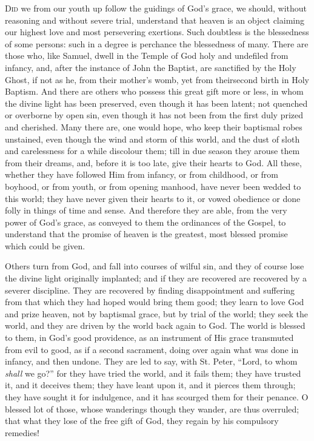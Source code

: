 D\textsc{id} we from our youth up follow the guidings of God's grace, we
should, without reasoning and without severe trial, understand that
heaven is an object claiming our highest love and most persevering
exertions. Such doubtless is the blessedness of some persons: such in
a degree is perchance the blessedness of many. There are those who,
like Samuel, dwell in the Temple of God holy and undefiled from
infancy, and, after the instance of John the Baptist, are sanctified
by the Holy Ghost, if not as he, from their mother's womb, yet from
their\emph{}second birth in Holy Baptism. And there are others who
possess this great gift more or less, in whom the divine light has
been preserved, even though it has been latent; not quenched or
overborne by open sin, even though it has not been from the first duly
prized and cherished. Many there are, one would hope, who keep their
baptismal robes unstained, even though the wind and storm of this
world, and the dust of sloth and carelessness for a while discolour
them; till in due season they arouse them from their dreams, and,
before it is too late, give their hearts to God. All these, whether
they have followed Him from infancy, or from childhood, or from
boyhood, or from youth, or from opening manhood, have never been
wedded to this world; they have never given their hearts to it, or
vowed obedience or done folly in things of time and sense. And
therefore they are able, from the very power of God's grace, as
conveyed to them the ordinances of the Gospel, to understand that the
promise of heaven is the greatest, most blessed promise which could be
given.

Others turn from God, and fall into courses of wilful sin, and they
of course lose the divine light originally implanted; and if they are
recovered are recovered by a severer discipline. They are recovered by
finding disappointment and suffering from that which they had hoped
would bring them good; they learn to love God and prize heaven, not by
baptismal grace, but by trial of the world; they seek the world, and
they are driven by the world back again to God. The world is blessed
to them, in God's good providence, as an instrument of His grace
transmuted from evil to good, as if a second sacrament, doing over
again what was done in infancy, and then undone. They are led to say,
with St. Peter, ``Lord, to whom \emph{shall} we go?'' for
they have tried the world, and it fails them; they have trusted it,
and it deceives them; they have leant upon it, and it pierces them
through; they have sought it for indulgence, and it has scourged them
for their penance. O blessed lot of those, whose wanderings though
they wander, are thus overruled; that what they lose of the free gift
of God, they regain by his compulsory remedies!

